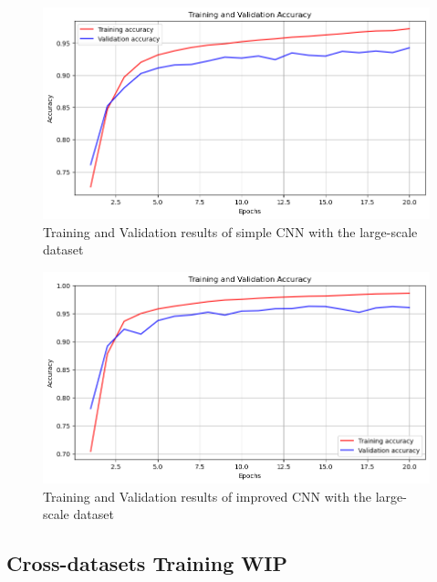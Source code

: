 \documentclass[final]{cvpr}
\begin{document}
\begin{figure}[t]
   \centering
   \includegraphics[width=0.9\linewidth]{img/ex-d2-simplecnn-accuracy-results.png}
   \caption{Training and Validation results of simple CNN with the large-scale dataset}
   \label{fig:ex-d2-simplecnn-results}
\end{figure}

\begin{figure}[t]
   \centering
   \includegraphics[width=0.9\linewidth]{img/ex-d2-improvedcnn-accuracy-results.png}
   \caption{Training and Validation results of improved CNN with the large-scale dataset}
   \label{fig:ex-d2-improvedcnn-results}
\end{figure}



\subsection{Cross-datasets Training WIP}
\end{document}
